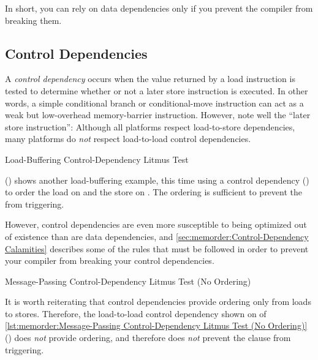 In short, you can rely on data dependencies only if you prevent the
compiler from breaking them.

\subsection{Control Dependencies}
\label{sec:memorder:Control Dependencies}

A \emph{control dependency} occurs when the value returned by a load
instruction is tested to determine whether or not a later store instruction
is executed.
In other words, a simple conditional branch or conditional-move
instruction can act as a weak but low-overhead memory-barrier instruction.
However, note well the ``later store instruction'':
Although all platforms respect load-to-store dependencies, many platforms
do \emph{not} respect load-to-load control dependencies.

\begin{listing}

\caption{Load-Buffering Control-Dependency Litmus Test}
\label{lst:memorder:Load-Buffering Control-Dependency Litmus Test}
\end{listing}

\begin{fcvref}
()
shows another load-buffering example, this time using a control
dependency () to order the load on  and the store on
.
The ordering is sufficient to prevent the  from triggering.
\end{fcvref}

However, control dependencies are even more susceptible to being optimized
out of existence than are data dependencies, and
\cref{sec:memorder:Control-Dependency Calamities}
describes some of the rules that must be followed in order to prevent
your compiler from breaking your control dependencies.

\begin{listing}

\caption{Message-Passing Control-Dependency Litmus Test (No Ordering)}
\label{lst:memorder:Message-Passing Control-Dependency Litmus Test (No Ordering)}
\end{listing}

\begin{fcvref}
It is worth reiterating that control dependencies provide ordering only
from loads to stores.
Therefore, the load-to-load control dependency shown on  of
\cref{lst:memorder:Message-Passing Control-Dependency Litmus Test (No Ordering)}
()
does \emph{not} provide ordering, and therefore does \emph{not}
prevent the  clause from triggering.
\end{fcvref}


